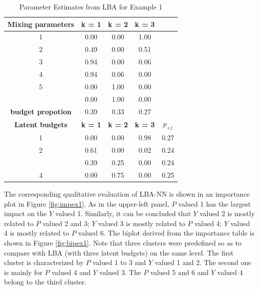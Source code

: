 \documentclass[]{interact}
\theoremstyle{plain}%
\theoremstyle{definition}
\theoremstyle{remark}
\begin{document}
\begin{table}[H]

\caption{\label{tab:lbaex1}Parameter Estimates from LBA for Example 1}
\centering
\begin{tabular}[t]{ccccc}
\toprule
\textbf{Mixing parameters} & \textbf{k = 1} & \textbf{k = 2} & \textbf{k = 3} & \textbf{}\\
\midrule
1 & 0.00 & 0.00 & 1.00 & \\
2 & 0.49 & 0.00 & 0.51 & \\
3 & 0.94 & 0.00 & 0.06 & \\
4 & 0.94 & 0.06 & 0.00 & \\
5 & 0.00 & 1.00 & 0.00 & \\
\addlinespace
6 & 0.00 & 1.00 & 0.00 & \\
\textbf{budget propotion} & 0.39 & 0.33 & 0.27 & \\
\textbf{Latent budgets} & \textbf{k = 1} & \textbf{k = 2} & \textbf{k = 3} & $p_{+j}$\\
1 & 0.00 & 0.00 & 0.98 & 0.27\\
2 & 0.61 & 0.00 & 0.02 & 0.24\\
\addlinespace
3 & 0.39 & 0.25 & 0.00 & 0.24\\
4 & 0.00 & 0.75 & 0.00 & 0.25\\
\bottomrule
\end{tabular}
\end{table}

The corresponding qualitative evaluation of LBA-NN is shown in an
importance plot in Figure \ref{fig:impex1}. As in the upper-left panel,
\(P\) valued 1 has the largest impact on the \(Y\) valued 1. Similarly,
it can be concluded that \(Y\) valued 2 is mostly related to \(P\)
valued 2 and 3; \(Y\) valued 3 is mostly related to \(P\) valued 4;
\(Y\) valued 4 is mostly related to \(P\) valued 6. The biplot derived
from the importance table is shown in Figure \ref{fig:bipex1}. Note that
three clusters were predefined so as to compare with LBA (with three
latent budgets) on the same level. The first cluster is characterized by
\(P\) valued 1 to 3 and \(Y\) valued 1 and 2. The second one is mainly
for \(P\) valued 4 and \(Y\) valued 3. The \(P\) valued 5 and 6 and
\(Y\) valued 4 belong to the third cluster.
\end{document}
